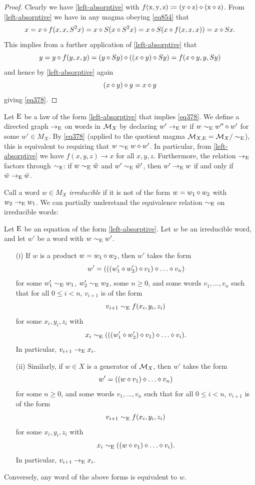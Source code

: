 \begin{proof}  Clearly we have \eqref{left-absorptive} with $f(\mathrm{x},\mathrm{y},\mathrm{z}) \coloneqq (\mathrm{y} \diamond \mathrm{z}) \diamond (\mathrm{x} \diamond \mathrm{z})$.  From \eqref{left-absorptive} we have in any magma obeying \eqref{eq854} that
$$x = x \diamond f(x,x,S^2 x) = x \diamond S(x \diamond S^2 x) = x \diamond S(x \diamond f(x,x,x)) = x \diamond Sx.$$
This implies from a further application of \eqref{left-absorptive} that
$$ y = y \diamond f(y,x,y) = (y \diamond Sy) \diamond ((x \diamond y) \diamond Sy) = f(x \diamond y, y, Sy)$$
and hence by \eqref{left-absorptive} again
$$ (x \diamond y) \diamond y = x \diamond y$$
giving \eqref{eq378}.
\end{proof}

Let $\mathrm{E}$ be a law of the form \eqref{left-absorptive} that implies \eqref{eq378}. We define a directed graph $\to_{\mathrm{E}}$ on words in ${\mathcal{M}}_X$ by declaring $w' \to_{\mathrm{E}} w$ if $w \sim_{\mathrm{E}} w'' \diamond w'$ for some $w' \in M_X$.  By \eqref{eq378} (applied to the quotient magma ${\mathcal{M}}_{X,\mathrm{E}} = {\mathcal{M}}_X/\sim_{\mathrm{E}}$), this is equivalent to requiring that $w \sim_{\mathrm{E}} w \diamond w'$. In particular, from \eqref{left-absorptive} we have $f(x,y,z) \to x$ for all $x,y,z$.  Furthermore, the relation $\to_{\mathrm{E}}$ factors through $\sim_{\mathrm{E}}$: if $w \sim_{\mathrm{E}} \tilde w$ and $w' \sim_{\mathrm{E}} \tilde w'$, then $w' \to_{\mathrm{E}} w$ if and only if $\tilde w \to_{\mathrm{E}} \tilde w$.

Call a word $w \in M_X$ \emph{irreducible} if it is not of the form $w = w_1 \diamond w_2$ with $w_2 \to_{\mathrm{E}} w_1$.  We can partially understand the equivalence relation $\sim_{\mathrm{E}}$ on irreducible words:

\begin{theorem}\label{irred-desc}  Let $\mathrm{E}$ be an equation of the form \eqref{left-absorptive}.  Let $w$ be an irreducible word, and let $w'$ be a word with $w \sim_{\mathrm{E}} w'$.
  \begin{itemize}
    \item[(i)] If $w$ is a product $w = w_1 \diamond w_2$, then $w'$ takes the form
$$ w' = (((w'_1 \op w'_2) \op v_1) \op \dots \op v_n)$$
for some $w'_1 \sim_{\mathrm{E}} w_1$, $w'_2 \sim_{\mathrm{E}} w_2$, some $n \geq 0$, and some words $v_1, \dots, v_n$ such that for all $0 \leq i < n$, $v_{i+1}$ is of the form
$$ v_{i+1} \sim_{\mathrm{E}} f(x_i,y_i,z_i)$$
for some $x_i, y_i, z_i$ with
$$ x_i \sim_\E (((w'_1 \op w'_2) \op v_1) \op \dots \op v_i).$$
In particular, $v_{i+1} \to_{\mathrm{E}} x_i$.
  \item[(ii)] Similarly, if $w \in X$ is a generator of ${\mathcal{M}}_X$, then $w'$ takes the form
$$ w' = ((w \op v_1) \op \dots \op v_n)$$
for some $n \geq 0$, and some words $v_1, \dots, v_n$ such that for all $0 \leq i < n$, $v_{i+1}$ is of the form
$$ v_{i+1} \sim_{\mathrm{E}} f(x_i,y_i,z_i)$$
for some $x_i, y_i, z_i$ with
$$ x_i \sim_\E ((w \op v_1) \op \dots \op v_i).$$
In particular, $v_{i+1} \to_{\mathrm{E}} x_i$.
\end{itemize}
Conversely, any word of the above forms is equivalent to $w$.
\end{theorem}

